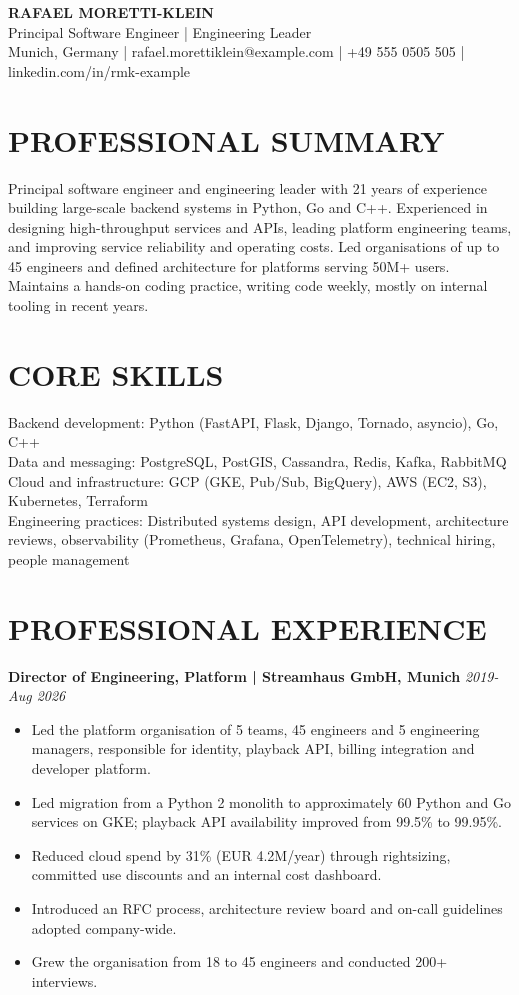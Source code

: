 \documentclass[11pt,a4paper]{article}
\begin{document}
\begin{center}
{\Huge\bfseries\color{primarycolor} RAFAEL MORETTI-KLEIN}\\[0.25em]
{\large\color{accentcolor} Principal Software Engineer | Engineering Leader}\\[0.25em]
Munich, Germany | rafael.morettiklein@example.com | +49 555 0505 505 | linkedin.com/in/rmk-example
\end{center}

\section*{PROFESSIONAL SUMMARY}
Principal software engineer and engineering leader with 21 years of experience building large-scale backend systems in Python, Go and C++. Experienced in designing high-throughput services and APIs, leading platform engineering teams, and improving service reliability and operating costs. Led organisations of up to 45 engineers and defined architecture for platforms serving 50M+ users. Maintains a hands-on coding practice, writing code weekly, mostly on internal tooling in recent years.

\section*{CORE SKILLS}
Backend development: Python (FastAPI, Flask, Django, Tornado, asyncio), Go, C++\\
Data and messaging: PostgreSQL, PostGIS, Cassandra, Redis, Kafka, RabbitMQ\\
Cloud and infrastructure: GCP (GKE, Pub/Sub, BigQuery), AWS (EC2, S3), Kubernetes, Terraform\\
Engineering practices: Distributed systems design, API development, architecture reviews, observability (Prometheus, Grafana, OpenTelemetry), technical hiring, people management

\section*{PROFESSIONAL EXPERIENCE}
\textbf{Director of Engineering, Platform | Streamhaus GmbH, Munich} \hfill \textit{2019-Aug 2026}
\begin{itemize}
\item Led the platform organisation of 5 teams, 45 engineers and 5 engineering managers, responsible for identity, playback API, billing integration and developer platform.
\item Led migration from a Python 2 monolith to approximately 60 Python and Go services on GKE; playback API availability improved from 99.5\% to 99.95\%.
\item Reduced cloud spend by 31\% (EUR 4.2M/year) through rightsizing, committed use discounts and an internal cost dashboard.
\item Introduced an RFC process, architecture review board and on-call guidelines adopted company-wide.
\item Grew the organisation from 18 to 45 engineers and conducted 200+ interviews.
\end{itemize}
\end{document}

